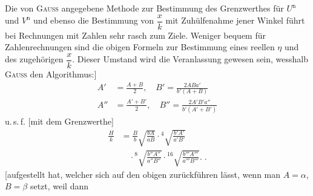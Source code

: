 Die von \textsc{Gauss} angegebene Methode zur Bestimmung des Grenzwerthes für
$U^{\mathrm n}$ und $V^{\mathrm n}$ und ebenso die Bestimmung von $\dfrac xk$ mit Zuhülfenahme jener Winkel
führt bei Rechnungen mit Zahlen sehr rasch zum Ziele. Weniger bequem
für Zahlenrechnungen sind die obigen Formeln zur Bestimmung eines reellen $\eta$
und des zugehörigen $\dfrac xk$. Dieser Umstand wird die Veranlassung gewesen sein,
wesshalb \textsc{Gauss} den Algorithmus:]
\[
\begin{aligned}
A'&=\frac{A+B}{2},\quad B'=\frac{2ABa'}{b'(A+B)}\\
A''&=\frac{A'+B'}{2},\quad B''=\frac{2A'B'a''}{b'(A'+B')}
\end{aligned}
\]
u.\,s.\,f. [mit dem Grenzwerthe]
\[
\begin{aligned}\frac Hk&=\frac Bb\surd{\frac{bA}{aB}}
\cdot{}^{4}\!\surd{\frac{b'A'}{a'B'}}
\\&\quad\cdot{}^{8}\!\surd{\frac{b''A''}{a''B''}}
\cdot{}^{16}\!\surd{\frac{b'''A'''}{a'''B'''}}.\;.\end{aligned}
\]
[aufgestellt hat, welcher sich auf den obigen zurückführen lässt, wenn man
$A=\alpha$, $B=\beta$ setzt, weil dann
